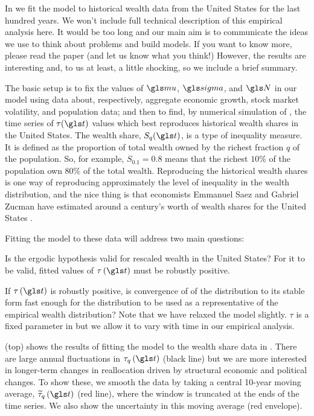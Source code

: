 In \cite{BermanPetersAdamou2017} we fit the \RGBM model to historical wealth data from the United States for the last hundred years. We won't include full technical description of this empirical analysis here. It would be too long and our main aim is to communicate the ideas we use to think about problems and build models. If you want to know more, please read the paper (and let us know what you think!) However, the results are interesting and, to us at least, a little shocking, so we include a brief summary.

The basic setup is to fix the values of $\gmu$, $\gsigma$, and $\N$ in our \RGBM model using data about, respectively, aggregate economic growth, stock market volatility, and population data; and then to find, by numerical simulation of , the time series of $\tau(\t)$ values which best reproduces historical wealth shares in the United States. The wealth share, $S_q(\t)$, is a type of inequality measure. It is defined as the proportion of total wealth owned by the richest fraction $q$ of the population. So, for example, $S_{0.1}=0.8$ means that the richest $10\%$ of the population own $80\%$ of the total wealth. Reproducing the historical wealth shares is one way of reproducing approximately the level of inequality in the wealth distribution, and the nice thing is that economists Emmanuel Saez and Gabriel Zucman have estimated around a century's worth of wealth shares for the United States \cite{SaezZucman2014}.

Fitting the model to these data will address two main questions:
\bi
\item Is the ergodic hypothesis valid for rescaled wealth in the United States? For it to be valid, fitted values of $\tau\left(\t\right)$ must be robustly positive.
\item If $\tau\left(\t\right)$ is robustly positive, is convergence of of the distribution to its stable form fast enough for the distribution to be used as a representative of the empirical wealth distribution?
\ei
Note that we have relaxed the model slightly. $\tau$ is a fixed parameter in  but we allow it to vary with time in our empirical analysis.

 (top) shows the results of fitting the \RGBM model to the wealth share data in \cite{SaezZucman2014}. There are large annual fluctuations in $\tau_q\left(\t\right)$ (black line) but we are more interested in longer-term changes in reallocation driven by structural economic and political changes. To show these, we smooth the data by taking a central 10-year moving average, $\widetilde{\tau}_q\left(\t\right)$ (red line), where the window is truncated at the ends of the time series. We also show the uncertainty in this moving average (red envelope).

